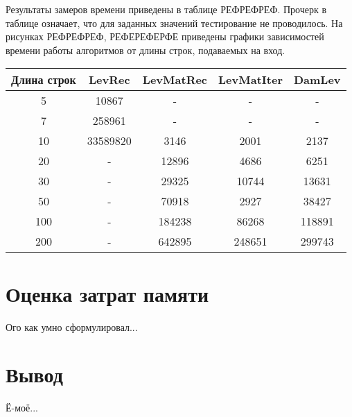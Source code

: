 \documentclass[12pt]{report}
\begin{document}
Результаты замеров времени приведены в таблице РЕФРЕФРЕФ. Прочерк в таблице означает, что для заданных значений тестирование не проводилось. На рисунках РЕФРЕФРЕФ, РЕФЕРЕФЕРФЕ приведены графики зависимостей времени работы алгоритмов от длины строк, подаваемых на вход.

\begin{center}
	\begin{tabular}{|c c c c c|} 
 	\hline
	Длина строк & LevRec & LevMatRec & LevMatIter & DamLev \\ [0.5ex] 
 	\hline\hline
 	5 & 10867 & - & - & -\\
 	\hline
 	7 & 258961 & - & - & -\\
 	\hline
	10 & 33589820 & 3146 & 2001 & 2137\\
	\hline
	20 & - & 12896 & 4686 & 6251\\
	\hline
	30 & - & 29325 & 10744 & 13631\\
	\hline
	50 & - & 70918 & 2927 & 38427\\
	\hline
	100 & - & 184238 & 86268 & 118891\\
	\hline
	200 & - & 642895 & 248651 & 299743\\
	\hline
	\end{tabular}
\end{center}

\section{Оценка затрат памяти}
Ого как умно сформулировал...

\section{Вывод}
Ё-моё...


\end{document}

